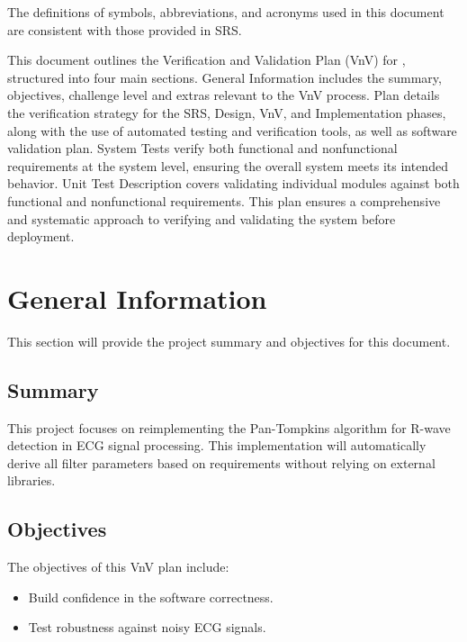 \documentclass[12pt, titlepage]{article}
\begin{document}
The definitions of symbols, abbreviations, and acronyms used in this document
are consistent with those provided in SRS\citep{SRS}.

\newpage


This document outlines the Verification and Validation Plan (VnV) for \progname,
structured into four main sections.  General Information includes the summary,
objectives, challenge level and extras relevant to the VnV process.  Plan
details the verification strategy for the SRS, Design, VnV, and Implementation
phases, along with the use of automated testing and verification tools, as well
as software validation plan. System Tests verify both functional and
nonfunctional requirements at the system level, ensuring the overall system
meets its intended behavior.  Unit Test Description covers validating individual
modules against both functional and nonfunctional requirements.  This plan
ensures a comprehensive and systematic approach to verifying and validating the
system before deployment.

\section{General Information}

This section will provide the project summary and objectives for this document.

\subsection{Summary}

This project focuses on reimplementing the Pan-Tompkins algorithm for R-wave
detection in ECG signal processing.  This implementation will automatically
derive all filter parameters based on requirements without relying on external
libraries.

\subsection{Objectives}

The objectives of this VnV plan include:

\begin{itemize}
  \item Build confidence in the software correctness.
  \item Test robustness against noisy ECG signals.
\end{itemize}
\end{document}
